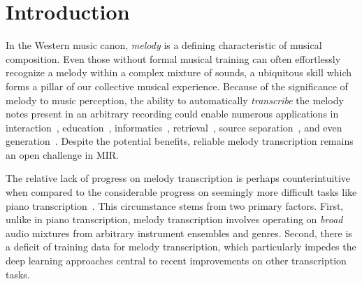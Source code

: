 \section{Introduction}\label{sec:introduction}

In the Western music canon, 
\emph{melody} is a defining characteristic of musical composition. 
Even those without formal musical training can often effortlessly recognize a melody within a complex mixture of sounds, 
a ubiquitous skill which forms a pillar of our collective musical experience. %
Because of the significance of melody to music perception, 
the ability to automatically \emph{transcribe} the melody notes present in an arbitrary recording 
could enable numerous applications in 
interaction~\cite{ryynanen2008accompaniment}, 
education~\cite{droe2006music}, 
informatics~\cite{bainbridge1999towards}, 
retrieval~\cite{ghias1995query}, 
source separation~\cite{ewert2014score},
and even generation~\cite{hawthorne2019enabling}.
Despite the potential benefits, 
reliable melody transcription remains an open challenge in MIR.

The relative lack of progress on melody transcription is perhaps counterintuitive when compared to the considerable progress on seemingly more difficult tasks like piano transcription~\cite{sigtia2016end,hawthorne2017onsets}.
This circumstance stems from two primary factors. 
First, unlike in piano transcription, melody transcription involves operating on \emph{broad}
audio mixtures from arbitrary instrument ensembles and genres. 
Second, there is a deficit of training data for melody transcription, which particularly impedes the deep learning approaches central to recent improvements on other transcription tasks. 

